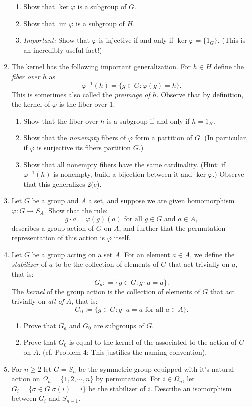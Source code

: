 \documentclass[11pt]{article}
\newcommand{\im}{\operatorname{im}}
\begin{document}
\begin{enumerate}
\begin{enumerate}
    \item Show that $\ker\varphi$ is a subgroup of $G$.
    \item Show that $\im\varphi$ is a subgroup of $H$.
    \item{\textit{Important:} Show that $\varphi$ is injective if and only if $\ker\varphi = \{1_G\}$.  (This is an incredibly useful fact!)}
  \end{enumerate}
  \item The kernel has the following important generalization.  For $h\in H$ define the \textit{fiber over $h$} as
  \[\varphi^{-1}(h) = \{g\in G:\varphi(g) = h\}.\]
  This is sometimes also called the \textit{preimage of $h$}.  Observe that by definition, the kernel of $\varphi$ is the fiber over 1.
  \begin{enumerate}
    \item{Show that the fiber over $h$ is a subgroup if and only if $h=1_H$.}
    \item{Show that the \textit{nonempty} fibers of $\varphi$ form a partition of $G$.  (In particular, if $\varphi$ is surjective its fibers partition $G$.)}
    \item{Show that all nonempty fibers have the same cardinality.  (Hint: if $\varphi^{-1}(h)$ is nonempty, build a bijection between it and $\ker\varphi$.)  Observe that this generalizes 2(c).}
  \end{enumerate}
  \item Let $G$ be a group and $A$ a set, and suppose we are given homomorphism $\varphi:G\to S_A$.  Show that the rule:
  \[g\cdot a = \varphi(g)(a)\text{ for all }g\in G\text{ and }a\in A,\]
  describes a group action of $G$ on $A$, and further that the permutation representation of this action is $\varphi$ itself.
  \item Let $G$ be a group acting on a set $A$.  For an element $a\in A$, we define the \textit{stabilizer} of $a$ to be the collection of elements of $G$ that act trivially on $a$, that is:
  \[G_a: = \{g\in G: g\cdot a = a\}.\]
  The \textit{kernel} of the group action is the collection of elements of $G$ that act trivially on \textit{all of} $A$, that is:
  \[G_0:=\{g\in G:g\cdot a=a\text{ for all }a\in A\}.\]
  \begin{enumerate}
  \item Prove that $G_a$ and $G_0$ are subgroups of $G$.
  \item Prove that $G_0$ is equal to the kernel of the  associated to the action of $G$ on $A$.  (cf. Problem 4: This justifies the naming convention).
  \end{enumerate}
    \item For $n\ge 2$ let $G = S_n$ be the symmetric group equipped with it's natural action on $\Omega_n = \{1,2,\cdots,n\}$ by permutations.  For $i\in\Omega_n$, let $G_i = \{\sigma\in G|\sigma(i)=i\}$ be the stabilizer of $i$.  Describe an isomorphism between $G_i$ and $S_{n-1}$.

\end{enumerate}
\end{document}
